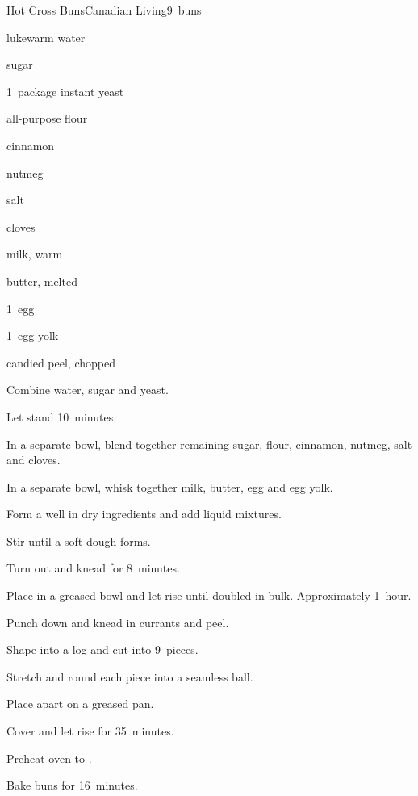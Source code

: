 \begin{recipe}{Hot Cross Buns}{Canadian Living}{9~buns}

\begin{ingredients}
\item \C{\quarter} lukewarm water
\item \C{\half} sugar
\item 1~package instant yeast
\item \C{3\half} all-purpose flour
\item {} cinnamon
\item {} nutmeg
\item \tp{\half} salt
\item \tp{\quarter} cloves
\item \C{\threequarter} milk, warm
\item \C{\quarter} butter, melted
\item 1~egg
\item 1~egg yolk
\item \C{\half} 
\item \C{\quarter} candied peel, chopped
\end{ingredients}

\begin{directions}
\item Combine water,  sugar and yeast.
\item Let stand 10~minutes.
\item In a separate bowl, blend together remaining sugar, flour, cinnamon, nutmeg, salt and cloves.
\item In a separate bowl, whisk together milk, butter, egg and egg yolk.
\item Form a well in dry ingredients and add liquid mixtures.
\item Stir until a soft dough forms.
\item Turn out and knead for 8~minutes.
\item Place in a greased bowl and let rise until doubled in bulk. Approximately 1~hour.
\item Punch down and knead in currants and peel.
\item Shape into a  log and cut into 9~pieces.
\item Stretch and round each piece into a seamless ball.
\item Place  apart on a greased pan.
\item Cover and let rise for 35~minutes.
\item Preheat oven to .
\item Bake buns for 16~minutes.
\end{directions}


\end{recipe}
